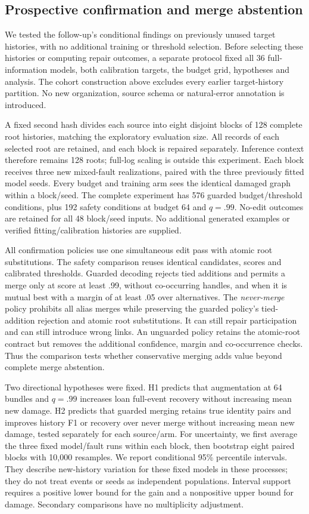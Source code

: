 \subsection{Prospective confirmation and merge abstention}
\label{sec:fresh-design}
We tested the follow-up's conditional findings on previously unused target histories, with no additional training or threshold selection. Before selecting these histories or computing repair outcomes, a separate protocol fixed all 36 full-information models, both calibration targets, the budget grid, hypotheses and analysis. The cohort construction above excludes every earlier target-history partition. No new organization, source schema or natural-error annotation is introduced.

A fixed second hash divides each source into eight disjoint blocks of 128 complete root histories, matching the exploratory evaluation size. All records of each selected root are retained, and each block is repaired separately. Inference context therefore remains 128 roots; full-log scaling is outside this experiment. Each block receives three new mixed-fault realizations, paired with the three previously fitted model seeds. Every budget and training arm sees the identical damaged graph within a block/seed. The complete experiment has 576 guarded budget/threshold conditions, plus 192 safety conditions at budget 64 and $q=.99$. No-edit outcomes are retained for all 48 block/seed inputs. No additional generated examples or verified fitting/calibration histories are supplied.

All confirmation policies use one simultaneous edit pass with atomic root substitutions. The safety comparison reuses identical candidates, scores and calibrated thresholds. Guarded decoding rejects tied additions and permits a merge only at score at least .99, without co-occurring handles, and when it is mutual best with a margin of at least .05 over alternatives. The \emph{never-merge} policy prohibits all alias merges while preserving the guarded policy's tied-addition rejection and atomic root substitutions. It can still repair participation and can still introduce wrong links. An unguarded policy retains the atomic-root contract but removes the additional confidence, margin and co-occurrence checks. Thus the comparison tests whether conservative merging adds value beyond complete merge abstention.

Two directional hypotheses were fixed. H1 predicts that augmentation at 64 bundles and $q=.99$ increases loan full-event recovery without increasing mean new damage. H2 predicts that guarded merging retains true identity pairs and improves history F1 or recovery over never merge without increasing mean new damage, tested separately for each source/arm. For uncertainty, we first average the three fixed model/fault runs within each block, then bootstrap eight paired blocks with 10,000 resamples. We report conditional 95\% percentile intervals. They describe new-history variation for these fixed models in these processes; they do not treat events or seeds as independent populations. Interval support requires a positive lower bound for the gain and a nonpositive upper bound for damage. Secondary comparisons have no multiplicity adjustment.

